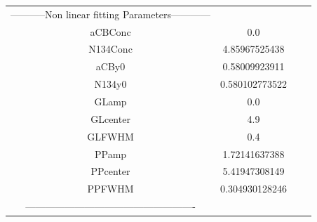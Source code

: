 \documentclass{article}
\begin{document}
\begin{tabular}{c c c c}

-----------Non linear fitting Parameters------------\\
aCBConc    &0.0\\
N134Conc   &4.85967525438\\
aCBy0      &0.58009923911\\
N134y0     &0.580102773522\\
GLamp      &0.0\\
GLcenter   &4.9\\
GLFWHM     &0.4\\
PPamp      &1.72141637388\\
PPcenter   &5.41947308149\\
PPFWHM     &0.304930128246\\
----------------------------------------------------\\


\end{tabular}
\end{document}
